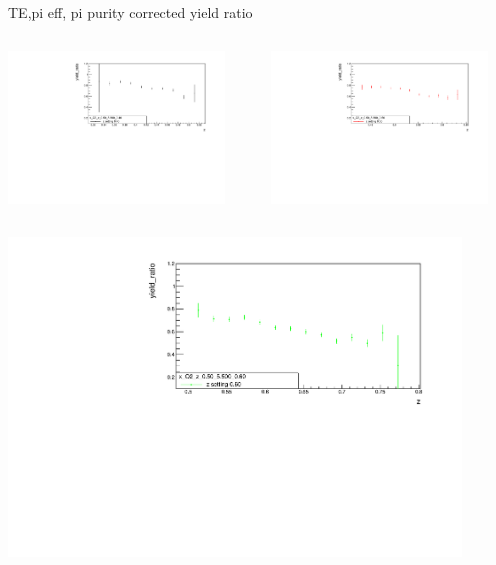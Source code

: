 \begin{frame}{TE,pi eff, pi purity corrected yield ratio}
\begin{columns}
\begin{column}[T]{0.5\textwidth}
\includegraphics[width = 0.9\textwidth]{results/yield/statistics_corr/x_Q2_z_0.50_5.500_0.40_ratio.pdf}
\end{column}
\begin{column}[T]{0.5\textwidth}
\includegraphics[width = 0.9\textwidth]{results/yield/statistics_corr/x_Q2_z_0.50_5.500_0.50_ratio.pdf}
\end{column}
\end{columns}
\begin{columns}
\begin{column}[T]{0.5\textwidth}
\includegraphics[width = 0.9\textwidth]{results/yield/statistics_corr/x_Q2_z_0.50_5.500_0.60_ratio.pdf}

\end{column}
\end{columns}
\end{frame}
